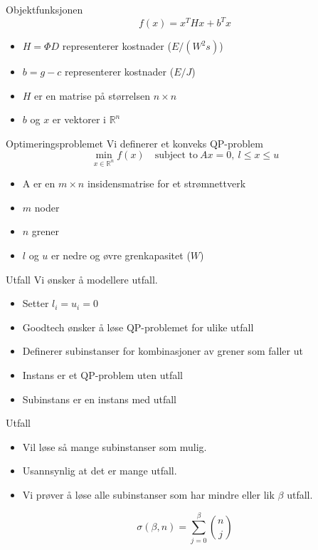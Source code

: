 \documentclass{beamer}
\begin{document}
\begin{frame}{Objektfunksjonen}
\[
f(x) = x^T H x + b^T x
\]
\begin{itemize}
\item $H = \Phi D$ representerer kostnader ($E/(W^2 s)$)
\item $b = g - c$ representerer kostnader ($E/J$)
\item $H$ er en matrise på størrelsen $n \times n$
\item $b$ og $x$ er vektorer i $\mathbb{R}^n$
\end{itemize}
\end{frame}



\begin{frame}{Optimeringsproblemet}
Vi definerer et konveks QP-problem
\[
\min_{x \in \mathbb{R}^n} f(x) \quad \textrm{subject to} ~ Ax = 0, ~ l \leq x \leq u
\]
\begin{itemize}
\item A er en $m \times n$ insidensmatrise for et strømnettverk
\item $m$ noder
\item $n$ grener
\item $l$ og $u$ er nedre og øvre grenkapasitet ($W$)
\end{itemize}
\end{frame}



\begin{frame}{Utfall}
Vi ønsker å modellere utfall.
\begin{itemize}
\item Setter $l_i = u_i = 0$
\item Goodtech ønsker å løse QP-problemet for ulike utfall
\item Definerer subinstanser for kombinasjoner av grener som faller ut
\item Instans er et QP-problem uten utfall
\item Subinstans er en instans med utfall
\end{itemize}
\end{frame}



\begin{frame}{Utfall}
\begin{itemize}
\item Vil løse så mange subinstanser som mulig.
\item Usannsynlig at det er mange utfall.
\item Vi prøver å løse alle subinstanser som har mindre eller lik $\beta$ utfall.
\end{itemize}
\[
\sigma (\beta, n) = \sum_{j=0}^{\beta} \binom{n}{j}
\]
\end{frame}
\end{document}
